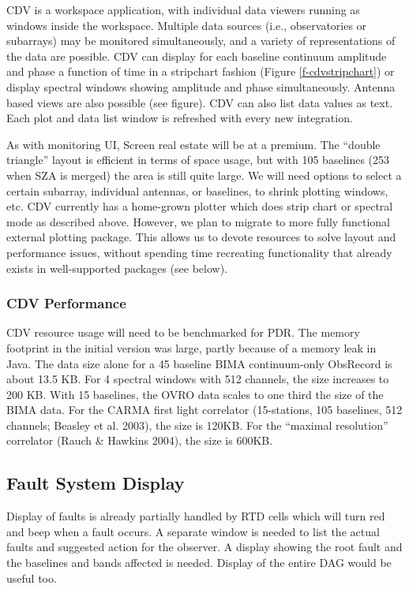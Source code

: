 \documentclass[preprint]{aastex}
\begin{document}
CDV is a workspace application, with individual data viewers running as
windows inside the workspace. Multiple data sources (i.e., observatories or
subarrays)
may be monitored simultaneously, and a variety of representations of
the data are possible.  CDV can display for each baseline continuum
amplitude and phase a function of time in a stripchart fashion (Figure
\ref{f-cdvstripchart}) or display spectral windows showing amplitude and
phase simultaneously.  Antenna based
views are also possible (see figure). CDV can also list
data values as text.  Each plot and data list window is refreshed with
every new integration.

As with monitoring UI, Screen real estate will be at a premium. The
``double triangle'' layout is efficient in terms of space usage, but with
105 baselines (253 when SZA is merged) the area is still quite large.
We will need options to select a certain subarray, individual antennas, or
baselines, to shrink plotting windows, etc.  CDV currently
has a home-grown plotter which does strip chart or spectral mode as
described above.  However, we plan to migrate to more fully functional
external plotting package.  This allows us to devote resources to solve layout
and performance issues, without spending time recreating functionality
that already exists in well-supported packages (see below).

\subsubsection{CDV Performance}

CDV resource usage will need to be benchmarked for PDR.
The memory footprint in the initial version was large, partly
because of a memory leak in Java. 
The data size alone for a 45 baseline BIMA continuum-only ObsRecord is about
13.5 KB. For 4 spectral windows with 512 channels, the size increases to
200 KB. With 15 baselines, the OVRO data scales to one third the size of
the BIMA data.  For the CARMA first light correlator 
(15-stations, 105 baselines, 512 channels; Beasley et al. 2003), 
the size is 120KB.  For the ``maximal resolution'' correlator (Rauch \&
Hawkins 2004), the size is 600KB.

\subsection{Fault System Display}
Display of faults is already partially handled by RTD cells which will
turn red and beep when a fault occurs. A separate window is needed to
list the actual faults and suggested action for the observer.  A display
showing the root fault and the baselines and bands affected is needed.
Display of the entire DAG would be useful too.
\end{document}
